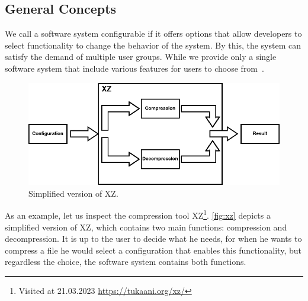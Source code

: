 \subsection{General Concepts}\label{ch:general-concepts}
We call a software system configurable if it offers options that allow developers to select functionality to change the behavior of the system. %
By this, the system can satisfy the demand of multiple user groups. 
While we provide only a single software system that include various features for users to choose from~\cite{TooManyKnobs}.


\begin{figure}[h]
    \centering
    \includegraphics[scale=0.55]{gfx/ConfigurableSystemXZ.png}
    \caption{Simplified version of \textsc{XZ}.}
    \label{fig:xz}
\end{figure}

As an example, let us inspect the compression tool \textsc{XZ}\footnote{Visited at 21.03.2023 \url{https://tukaani.org/xz/}}.
\autoref{fig:xz} depicts a simplified version of \textsc{XZ}, which contains two main functions: compression and decompression. 
It is up to the user to decide what he needs, for when he wants to compress a file he would select a configuration that enables this functionality,
but regardless the choice, the software system contains both functions.
